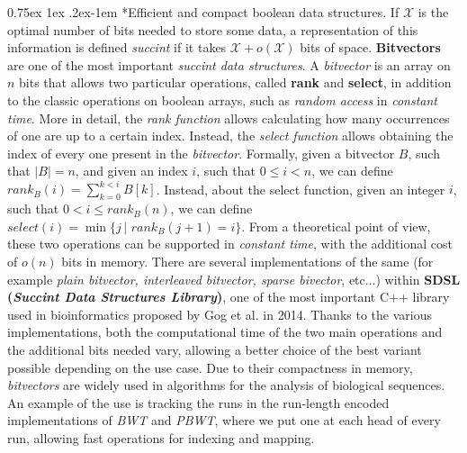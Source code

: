 \documentclass[a4paper,11pt, oneside]{article}
\makeatletter
\newcommand{\dc}[1]{\todo[[backgroundcolor=yellow]{\textbf{DC} #1}}
\renewcommand{\paragraph}{%
  \@startsection{paragraph}{4}%
  {\z@}{0.75ex \@plus 1ex \@minus .2ex}{-1em}%
  {\normalfont\normalsize\bfseries}%
}
\makeatother
\begin{document}
\paragraph*{Efficient and compact boolean data structures.}
If $\mathcal{X}$ is the optimal number of bits needed to store some data, a
representation of this information is defined \textit{succint} if it takes
$\mathcal{X} +o(\mathcal{X})$ bits of space. 
\textbf{Bitvectors} are one of the most important \textit{succint data
  structures}.  
A \textit{bitvector} is an array on $n$ bits that allows two particular
operations, called \textbf{rank} and \textbf{select}, in addition to the classic
operations on boolean arrays, such as \textit{random access} in
\textit{constant time}. More in detail, the \textit{rank
function} allows calculating how many occurrences of one are up to a certain
index. Instead, the \textit{select function} allows obtaining the index of every
one present in the \textit{bitvector}. Formally, given a bitvector $B$, such
that $|B|=n$, and given an index $i$, such that $0\leq i<n$, we can define
$rank_B(i)=\sum_{k=0}^{k<i} B[k]$. Instead, about the select function, given an
integer $i$, such that $0<i\leq rank_B(n)$, we can define
$select(i)=\min\{j \,| \,\, rank_B(j+1)=i\}$.
From a theoretical point of view, these two operations can be supported in
\textit{constant time}, with the additional cost of $o(n)$ bits in
memory. There are several implementations of the 
same (for example \textit{plain bitvector, interleaved
  bitvector, sparse bivector}, etc$\ldots$) within \textbf{SDSL (\textit{Succint
    Data Structures Library})}, one of the most important C++ library used in
bioinformatics proposed by Gog et al. in 2014. Thanks to the various
implementations, both the computational time of the two main 
operations and the additional bits needed vary, allowing a
better choice of the best variant possible depending on the use case. Due to
their compactness in memory, \textit{bitvectors} are widely used in algorithms
for the analysis of biological sequences. An example of the use is 
tracking the runs in the run-length encoded implementations of \textit{BWT} and
\textit{PBWT}, where we put one at each head of every run, allowing fast
operations for indexing and mapping. 
\end{document}

